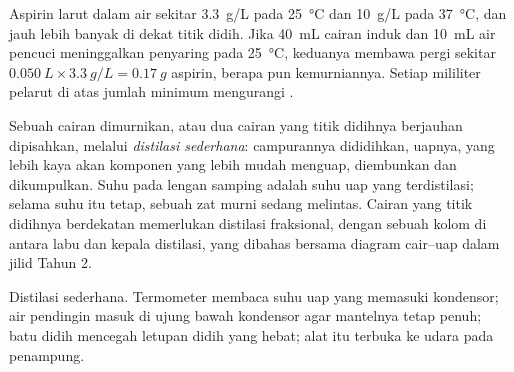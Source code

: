 \begin{example}
Aspirin larut dalam air sekitar \qty{3.3}{g/L} pada \qty{25}{\celsius}
dan \qty{10}{g/L} pada \qty{37}{\celsius}, dan jauh lebih banyak di dekat
titik didih. Jika \qty{40}{mL} cairan induk dan \qty{10}{mL} air pencuci
meninggalkan penyaring pada \qty{25}{\celsius}, keduanya membawa pergi
sekitar
$\qty{0.050}{L} \times \qty{3.3}{g/L} = \qty{0.17}{g}$ aspirin, berapa pun
kemurniannya. Setiap mililiter pelarut di atas jumlah minimum mengurangi
.
\end{example}

Sebuah cairan dimurnikan, atau dua cairan yang titik didihnya berjauhan
dipisahkan, melalui \emph{distilasi sederhana}: campurannya dididihkan,
uapnya, yang lebih kaya akan komponen yang lebih mudah menguap,
diembunkan dan dikumpulkan. Suhu pada lengan samping adalah suhu uap yang
terdistilasi; selama suhu itu tetap, sebuah zat murni sedang melintas.
Cairan yang titik didihnya berdekatan memerlukan distilasi fraksional,
dengan sebuah kolom di antara labu dan kepala distilasi, yang dibahas
bersama diagram cair--uap dalam jilid Tahun 2.

\begin{omfigure}

{\small Distilasi sederhana. Termometer membaca suhu uap yang memasuki
kondensor; air pendingin masuk di ujung bawah kondensor agar mantelnya
tetap penuh; batu didih mencegah letupan didih yang hebat; alat itu
terbuka ke udara pada penampung.}
\end{omfigure}

